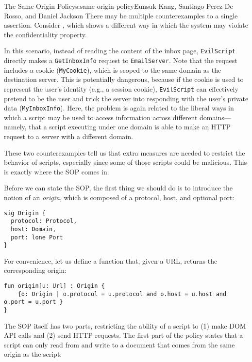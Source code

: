 \begin{aosachapter}{The Same-Origin Policy}{s:same-origin-policy}{Eunsuk Kang, Santiago Perez De Rosso, and Daniel Jackson}
There may be multiple counterexamples to a single assertion. Consider
, which shows a
different way in which the system may violate the confidentiality
property.


In this scenario, instead of reading the content of the inbox page,
\texttt{EvilScript} directly makes a \texttt{GetInboxInfo} request to
\texttt{EmailServer}. Note that the request includes a cookie
(\texttt{MyCookie}), which is scoped to the same domain as the
destination server. This is potentially dangerous, because if the cookie
is used to represent the user's identity (e.g., a session cookie),
\texttt{EvilScript} can effectively pretend to be the user and trick the
server into responding with the user's private data
(\texttt{MyInboxInfo}). Here, the problem is again related to the
liberal ways in which a script may be used to access information across
different domains---namely, that a script executing under one domain is
able to make an HTTP request to a server with a different domain.

These two counterexamples tell us that extra measures are needed to
restrict the behavior of scripts, especially since some of those scripts
could be malicious. This is exactly where the SOP comes in.

\label{same-origin-policy}

Before we can state the SOP, the first thing we should do is to
introduce the notion of an \emph{origin}, which is composed of a
protocol, host, and optional port:

\begin{verbatim}
sig Origin {
  protocol: Protocol,
  host: Domain,
  port: lone Port
}
\end{verbatim}

For convenience, let us define a function that, given a URL, returns the
corresponding origin:

\begin{verbatim}
fun origin[u: Url] : Origin {
    {o: Origin | o.protocol = u.protocol and o.host = u.host and o.port = u.port }
}
\end{verbatim}

The SOP itself has two parts, restricting the ability of a script to (1)
make DOM API calls and (2) send HTTP requests. The first part of the
policy states that a script can only read from and write to a document
that comes from the same origin as the script:


\end{aosachapter}
